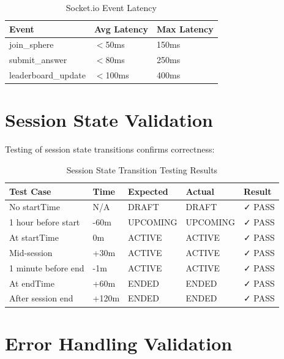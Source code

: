 \documentclass[12pt,a4paper]{report}
\newcommand{\rA}{\rowcolor{white}}
\newcommand{\rB}{\rowcolor{lightgray}}
\newcommand{\rH}{\rowcolor{headcol}}
\begin{document}
\begin{table}[H]
  \centering
  \small
  \begin{tabular}{|l|l|l|}
    \hline
    \rH \textbf{Event} & \textbf{Avg Latency} & \textbf{Max Latency} \\
    \hline
    \rA join\_sphere & $<$50ms & 150ms \\
    \hline
    \rB submit\_answer & $<$80ms & 250ms \\
    \hline
    \rA leaderboard\_update & $<$100ms & 400ms \\
    \hline
  \end{tabular}
  \caption{Socket.io Event Latency}
  \label{tab:socket_latency}
\end{table}

\section{Session State Validation}

Testing of session state transitions confirms correctness:

\begin{table}[H]
  \centering
  \footnotesize
  \begin{tabular}{|l|l|l|l|l|}
    \hline
    \rH \textbf{Test Case} & \textbf{Time} & \textbf{Expected} & \textbf{Actual} & \textbf{Result} \\
    \hline
    \rA No startTime & N/A & DRAFT & DRAFT & ✓ PASS \\
    \hline
    \rB 1 hour before start & -60m & UPCOMING & UPCOMING & ✓ PASS \\
    \hline
    \rA At startTime & 0m & ACTIVE & ACTIVE & ✓ PASS \\
    \hline
    \rB Mid-session & +30m & ACTIVE & ACTIVE & ✓ PASS \\
    \hline
    \rA 1 minute before end & -1m & ACTIVE & ACTIVE & ✓ PASS \\
    \hline
    \rB At endTime & +60m & ENDED & ENDED & ✓ PASS \\
    \hline
    \rA After session end & +120m & ENDED & ENDED & ✓ PASS \\
    \hline
  \end{tabular}
  \caption{Session State Transition Testing Results}
  \label{tab:session_tests}
\end{table}

\section{Error Handling Validation}
\end{document}

